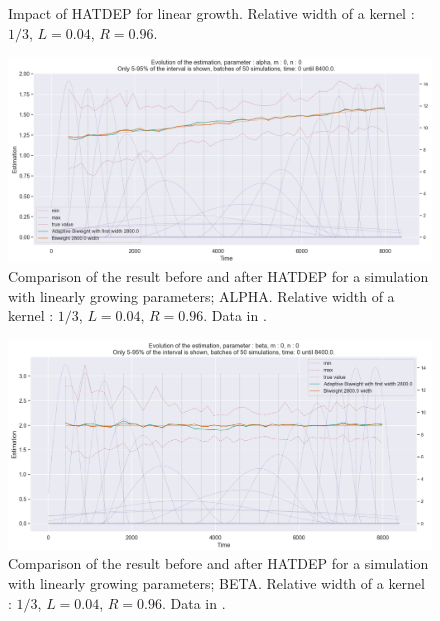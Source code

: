 \begin{figure}
\centering
{} 
\caption{Impact of HATDEP for linear growth. Relative width of a kernel : $1/3$, $L = 0.04$, $R = 0.96$.}
\label{fig:compar_kernels_1}
\end{figure}

\begin{figure}
\centering
\includegraphics[width = 0.90 \textwidth]{../imag/chap3/1/D.png}
\caption{Comparison of the result before and after HATDEP for a simulation with linearly growing parameters; ALPHA. Relative width of a kernel : $1/3$, $L = 0.04$, $R = 0.96$. Data in \protect {}.}
\label{fig:first_estimate_1_alpha}
\end{figure}

\begin{figure}
\centering
\includegraphics[width = 0.90 \textwidth]{../imag/chap3/1/E.png}
\caption{Comparison of the result before and after HATDEP for a simulation with linearly growing parameters; BETA. Relative width of a kernel : $1/3$, $L = 0.04$, $R = 0.96$. Data in \protect {}.}
\label{fig:first_estimate_1_beta}
\end{figure}

